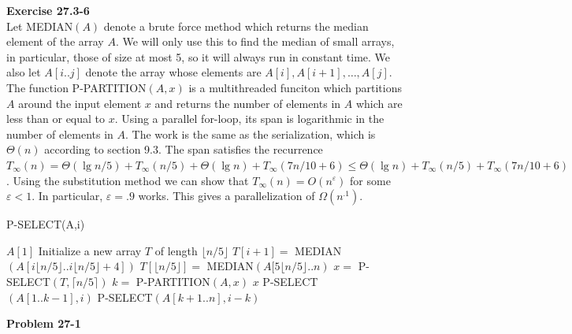 \documentclass{article}
\begin{document}
\noindent\textbf{Exercise 27.3-6}\\

Let MEDIAN$(A)$ denote a brute force method which returns the median element of the array $A$.  We will only use this to find the median of small arrays, in particular, those of size at most 5, so it will always run in constant time.  We also let $A[i..j]$ denote the array whose elements are $A[i], A[i+1], \ldots, A[j]$.  The function P-PARTITION$(A,x)$ is a multithreaded funciton which partitions $A$ around the input element $x$ and returns the number of elements in $A$ which are less than or equal to $x$. Using a parallel for-loop, its span is logarithmic in the number of elements in $A$.  The work is the same as the serialization, which is $\Theta(n)$ according to section 9.3.  The span satisfies the recurrence $T_\infty(n) = \Theta(\lg n/5) + T_\infty(n/5) + \Theta(\lg n) + T_\infty(7n/10 + 6) \leq \Theta(\lg n) + T_\infty(n/5) + T_\infty(7n/10 + 6)$.  Using the substitution method we can show that $T_\infty(n) = O(n^\varepsilon)$ for some $\varepsilon < 1$.  In particular, $\varepsilon = .9$ works.  This gives a parallelization of $\Omega(n^{.1})$.\\



\begin{algorithm}
\caption{P-SELECT(A,i)}
\begin{algorithmic}[1]
	\State \Return $A[1]$
\EndIf
\State Initialize a new array $T$ of length $\lfloor n/5 \rfloor$
	\State $T[i+1] = $ MEDIAN$(A[i\lfloor n/5 \rfloor..i\lfloor n/5 \rfloor + 4])$
\EndParFor
{}
	\State $T[\lfloor n/5 \rfloor] =$  MEDIAN$(A[5\lfloor n/5 \rfloor..n)$
\EndIf
\State $x = $ P-SELECT$(T, \lceil n/5 \rceil)$
\State $k = $ P-PARTITION$(A,x)$
	\State \Return $x$
	\State P-SELECT$(A[1..k-1],i)$
\Else
	\State P-SELECT$(A[k+1..n],i-k)$
\EndIf
\end{algorithmic}
\end{algorithm}

\noindent\textbf{Problem 27-1}\\
\end{document}
